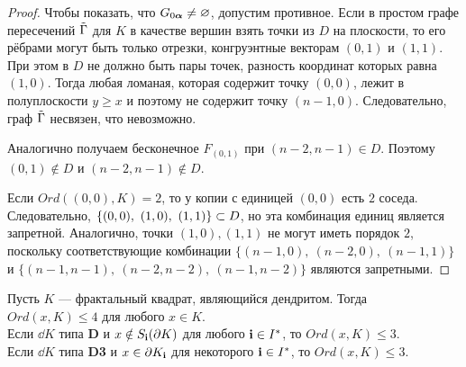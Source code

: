 \begin{proof}
Чтобы показать, что $G_{0{\bm{\alpha}}}\neq\varnothing$, допустим противное.
Если в простом графе пересечений $\tilde{\Gamma}$ для $K$ в качестве вершин взять точки из $D$ на плоскости, то его рёбрами могут быть только отрезки, конгруэнтные векторам $(0,1)$ и $(1,1)$.
При этом в $D$ не должно быть пары точек, разность координат которых равна $(1,0)$.
Тогда любая ломаная, которая содержит точку $(0,0)$, лежит в полуплоскости $y\ge x$ и поэтому не содержит точку $(n-1,0)$.
Следовательно, граф $\tilde{\Gamma}$ несвязен, что невозможно.

Аналогично получаем бесконечное $F_{(0,1)}$ при $(n-2,n-1)\in D$.
Поэтому $(0,1)\notin D$ и $(n-2,n-1)\notin D$. 
 
Если $Ord((0,0),K)=2$, то у копии с единицей $(0,0)$ есть $2$ соседа. 
Следовательно, $\{(0,0),\ (1,0),\ (1,1)\}\IN D$, но эта комбинация единиц является запретной.
Аналогично, точки $(1,0), (1,1)$ не могут иметь порядок $2$, поскольку соответствующие комбинации $\{(n-1,0),\ (n-2,0),\ (n-1,1)\}$ и $\{(n-1,n-1),\ (n-2,n-2),\ (n-1,n-2)\}$ являются запретными. 
\end{proof} 



\begin{theorem}\label{order}
Пусть $K$ --- фрактальный квадрат, являющийся дендритом. 
Тогда $Ord(x,K)\le 4$ для любого $x\in K$.\\
Если $\dd K$ типа {\bf D} и $x\notin S_{\bf{i}}(\partial K)$ для любого ${\bf{i}}\in I^*$, то $Ord(x,K)\le 3$.\\
Если $\dd K$ типа {\bf D3} и $x\in \partial K_{\bf{i}}$ для некоторого ${\bf{i}}\in I^*$, то $Ord(x, K)\le 3$.
\end{theorem}

